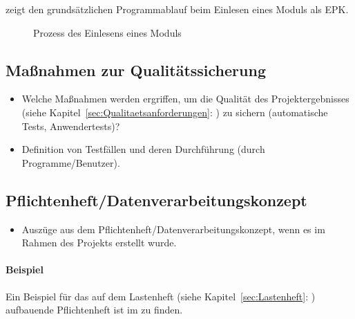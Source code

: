  zeigt den grundsätzlichen Programmablauf beim Einlesen eines Moduls als \ac{EPK}.
\begin{figure}[htb]
\centering
{}
\caption{Prozess des Einlesens eines Moduls}
\label{fig:Modulimport}
\end{figure}


\subsection{Maßnahmen zur Qualitätssicherung}
\label{sec:Qualitaetssicherung}
\begin{itemize}
	\item Welche Maßnahmen werden ergriffen, um die Qualität des Projektergebnisses (siehe Kapitel~\ref{sec:Qualitaetsanforderungen}: ) zu sichern (\zB automatische Tests, Anwendertests)?
	\item \Ggfs Definition von Testfällen und deren Durchführung (durch Programme/Benutzer).
\end{itemize}


\subsection{Pflichtenheft/Datenverarbeitungskonzept}
\label{sec:Pflichtenheft}
\begin{itemize}
	\item Auszüge aus dem Pflichtenheft/Datenverarbeitungskonzept, wenn es im Rahmen des Projekts erstellt wurde.
\end{itemize}

\paragraph{Beispiel}
Ein Beispiel für das auf dem Lastenheft (siehe Kapitel~\ref{sec:Lastenheft}: ) aufbauende Pflichtenheft ist im  zu finden.
